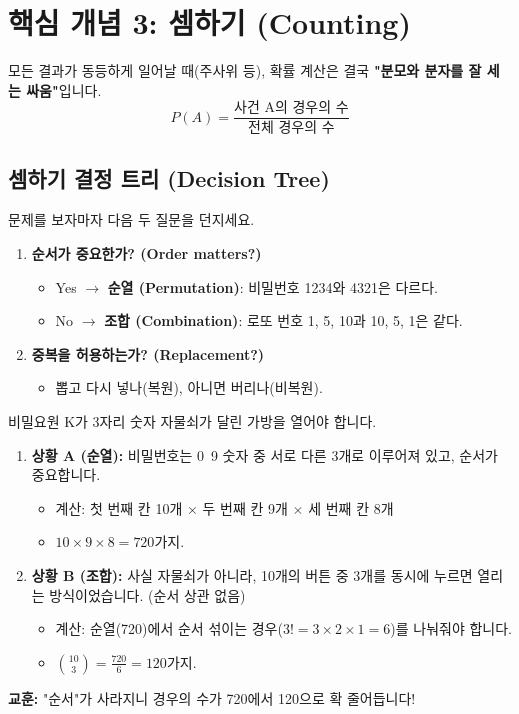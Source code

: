 \documentclass[11pt,a4paper]{book}
\theoremstyle{definition}
\begin{document}
\section{핵심 개념 3: 셈하기 (Counting)}

모든 결과가 동등하게 일어날 때(주사위 등), 확률 계산은 결국 \textbf{"분모와 분자를 잘 세는 싸움"}입니다.
\[ P(A) = \frac{\text{사건 A의 경우의 수}}{\text{전체 경우의 수}} \]

\subsection{셈하기 결정 트리 (Decision Tree)}
문제를 보자마자 다음 두 질문을 던지세요.
\begin{enumerate}
    \item \textbf{순서가 중요한가? (Order matters?)}
    \begin{itemize}
        \item Yes $\rightarrow$ \textbf{순열 (Permutation)}: 비밀번호 1234와 4321은 다르다.
        \item No $\rightarrow$ \textbf{조합 (Combination)}: 로또 번호 1, 5, 10과 10, 5, 1은 같다.
    \end{itemize}
    \item \textbf{중복을 허용하는가? (Replacement?)}
    \begin{itemize}
        \item 뽑고 다시 넣나(복원), 아니면 버리나(비복원).
    \end{itemize}
\end{enumerate}

\begin{storybox}[title={비밀요원 K의 가방 열기 (Counting 시나리오)}]
비밀요원 K가 3자리 숫자 자물쇠가 달린 가방을 열어야 합니다.
\begin{enumerate}
    \item \textbf{상황 A (순열):} 비밀번호는 0~9 숫자 중 서로 다른 3개로 이루어져 있고, 순서가 중요합니다.
    \begin{itemize}
        \item 계산: 첫 번째 칸 10개 $\times$ 두 번째 칸 9개 $\times$ 세 번째 칸 8개
        \item $10 \times 9 \times 8 = 720$가지.
    \end{itemize}
    
    \item \textbf{상황 B (조합):} 사실 자물쇠가 아니라, 10개의 버튼 중 3개를 동시에 누르면 열리는 방식이었습니다. (순서 상관 없음)
    \begin{itemize}
        \item 계산: 순열(720)에서 순서 섞이는 경우($3! = 3 \times 2 \times 1 = 6$)를 나눠줘야 합니다.
        \item $\binom{10}{3} = \frac{720}{6} = 120$가지.
    \end{itemize}
\end{enumerate}
\textbf{교훈:} "순서"가 사라지니 경우의 수가 720에서 120으로 확 줄어듭니다!
\end{storybox}
\end{document}
